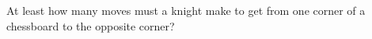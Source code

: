 At least how many moves must a knight make to get from one corner of a chessboard to the opposite corner?